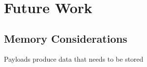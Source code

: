 \section{Future Work}

\subsection{Memory Considerations}
Payloads produce data that needs to be stored